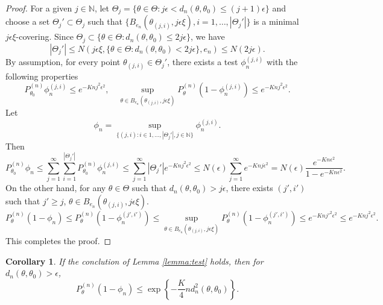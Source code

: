 \documentclass[11pt]{article}
\theoremstyle{plain}
\newtheorem{corollary}{\quad\quad Corollary}
\theoremstyle{definition}
\theoremstyle{remark}
\begin{document}
\begin{proof}
    For a given $j \in \mathbb N$, let $\Theta_j = \{\theta \in \Theta: j \epsilon < d_n (\theta, \theta_0) \leq (j+1) \epsilon \}$ and choose a set $\Theta_j'\subset \Theta_j$ such that $\{B_{e_n}(\theta_{(j,i)}, j\epsilon\xi), i=1,\dots, |\Theta_j'|\}$ is a minimal $j\epsilon\xi$-covering.
    Since $\Theta_j\subset \{\theta\in \Theta: d_n(\theta, \theta_0)\leq 2 j \epsilon\}$, we have
    \begin{equation*}
        |\Theta_j'| \leq
        N\left(  j \epsilon \xi, \{\theta\in \Theta: d_n (\theta, \theta_0)< 2j \epsilon\}, e_n \right) \leq N(2j\epsilon).
    \end{equation*}
    By assumption, for every point $\theta_{(j,i)} \in \Theta_j'$, there exists a test $\phi_{n}^{(j,i)}$ with the following properties
\begin{equation*}
    P_{\theta_0}^{(n)} \phi_n^{(j,i)} \leq e^{-K n j^2 \epsilon^2},
    \quad
    \sup_{\theta\in B_{e_n} (\theta_{(j,i)},j \epsilon \xi)}
    P_{\theta}^{(n)} (1-\phi_n^{(j,i)})
    \leq e^{-K n j^2 \epsilon^2}.
\end{equation*}
Let
\begin{equation*}
    \phi_n = \sup_{\{(j,i): i \in 1,\dots, |\Theta_j'|,j\in \mathbb N\}} \phi_{n}^{(j,i)}.
\end{equation*}
Then
\begin{equation*}
    P_{\theta_0}^{(n)} \phi_n
    \leq \sum_{j=1}^\infty
    \sum_{i=1}^{|\Theta_j'|}
    P_{\theta_0}^{(n)} \phi_n^{(j,i)}
    \leq 
    \sum_{j=1}^\infty
    |\Theta_j'|
    e^{-K n j^2 \epsilon^2}
    \leq 
    N(\epsilon)
    \sum_{j=1}^\infty
    e^{-K n j \epsilon^2}
    = 
    N(\epsilon)
    \frac{e^{-K n \epsilon^2}}{1-e^{-K n \epsilon^2}}
    .
\end{equation*}
On the other hand, for any $\theta \in \Theta$ such that $d_n(\theta,\theta_0)> j\epsilon$, there exists $(j',i')$ such that $j'\geq j$, $\theta \in B_{e_n}(\theta_{(j,i)}, j\epsilon \xi)$.
\begin{equation*}
P_{\theta}^{(n)} (1-\phi_n)
\leq
P_{\theta}^{(n)} (1-\phi_n^{(j',i')})
\leq
\sup_{\theta\in B_{e_n} (\theta_{(j,i)},j \epsilon \xi)}
P_{\theta}^{(n)} (1-\phi_n^{(j',i')})
    \leq e^{-K n j'^2 \epsilon^2}
    \leq e^{-K n j^2 \epsilon^2}.
\end{equation*}
This completes the proof.

\end{proof}
\begin{corollary}
    If the conclution of Lemma \ref{lemma:test} holds, then for $d_n(\theta,\theta_0)>\epsilon$,
    \begin{equation*}
        P_{\theta}^{(n)} (1-\phi_n) 
        \leq \exp\left\{-\frac{K}{4} n d_n^2(\theta,\theta_0) \right\}.
    \end{equation*}
    \label{corollary:test}
\end{corollary}
\end{document}
